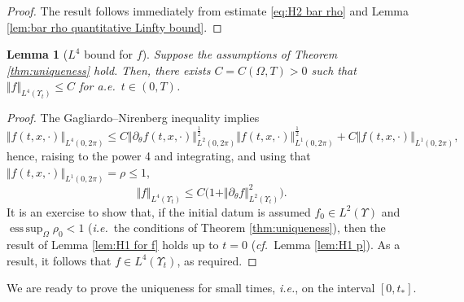 \documentclass[11pt,a4paper,reqno]{amsart}
\newtheorem{lemma}[prop]{Lemma}
\theoremstyle{remark}
\theoremstyle{definition}
\numberwithin{equation}{section}
\DeclareMathOperator{\esssup}{ess \, sup}
\begin{document}
\begin{proof}
The result follows immediately from estimate \eqref{eq:H2 bar rho} and Lemma \ref{lem:bar rho quantitative Linfty bound}. 
\end{proof}

\begin{lemma}[$L^4$ bound for $f$]\label{lem:L4 f for uniqueness}
   Suppose the assumptions of Theorem \ref{thm:uniqueness} hold. Then, there exists $C=C(\Omega,T)>0$ such that $ \Vert f \Vert_{L^4(\Upsilon_t)} \leq C$ for a.e.~$t \in (0,T)$.
\end{lemma}

\begin{proof}
    The Gagliardo--Nirenberg inequality implies 
\begin{equation*}
    \Vert f(t,x,\cdot) \Vert_{L^4(0,2\pi)} \leq C \Vert \partial_\theta f(t,x,\cdot) \Vert_{L^2(0,2\pi)}^{\frac{1}{2}} \Vert f(t,x,\cdot) \Vert_{L^1(0,2\pi)}^{\frac{1}{2}} + C \Vert f(t,x,\cdot) \Vert_{L^1(0,2\pi)}, 
\end{equation*}
hence, raising to the power 4 and integrating, and using that $\Vert f(t,x,\cdot) \Vert_{L^1(0,2\pi)} = \rho \leq 1$, 
\begin{equation*}
    \Vert f\Vert_{L^4(\Upsilon_t)} \leq C \Big( 1 + \Vert \partial_\theta f \Vert_{L^2(\Upsilon_t)}^{2} \Big). 
\end{equation*}
It is an exercise to show that, if the initial datum is assumed $f_0 \in L^2(\Upsilon)$ and $\esssup_{\Omega} \rho_0 < 1$ (\textit{i.e.}~the conditions of Theorem \ref{thm:uniqueness}), then the result of Lemma \ref{lem:H1 for f} holds up to $t=0$ (\textit{cf.}~Lemma \ref{lem:H1 p}). As a result, it follows that $f \in L^4(\Upsilon_t)$, as required. 
\end{proof}


We are ready to prove the uniqueness for small times, \textit{i.e.}, on the interval $[0,t_*]$. 
\end{document}
